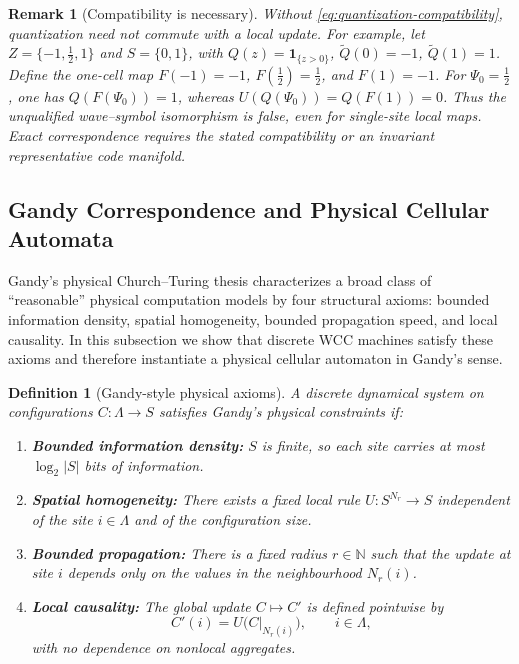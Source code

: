 \documentclass[12pt]{article}
\newtheorem{definition}[theorem]{Definition}
\newtheorem{remark}[theorem]{Remark}
\begin{document}
\begin{remark}[Compatibility is necessary]
\label{rem:wave-symbol-obstruction}
Without \eqref{eq:quantization-compatibility}, quantization need not
commute with a local update. For example, let
$Z=\{-1,\tfrac12,1\}$ and $S=\{0,1\}$, with
$Q(z)=\mathbf{1}_{\{z>0\}}$, $\widetilde Q(0)=-1$,
$\widetilde Q(1)=1$. Define the one-cell map
$F(-1)=-1$, $F(\tfrac12)=\tfrac12$, and $F(1)=-1$.
For $\Psi_0=\tfrac12$, one has $Q(F(\Psi_0))=1$,
whereas $U(Q(\Psi_0))=Q(F(1))=0$.
Thus the unqualified wave--symbol isomorphism is false, even for
single-site local maps. Exact correspondence requires the stated
compatibility or an invariant representative code manifold.
\end{remark}


\subsection{Gandy Correspondence and Physical Cellular Automata}
\label{subsec:gandy-correspondence}

Gandy's physical Church--Turing thesis characterizes a broad class of
``reasonable'' physical computation models by four structural axioms:
bounded information density, spatial homogeneity, bounded propagation
speed, and local causality. In this subsection we show that discrete WCC
machines satisfy these axioms and therefore instantiate a physical cellular
automaton in Gandy's sense.

\begin{definition}[Gandy-style physical axioms]
A discrete dynamical system on configurations $C : \Lambda \to S$ satisfies
Gandy's physical constraints if:
\begin{enumerate}
  \item \textbf{Bounded information density:} $S$ is finite, so each site
    carries at most $\log_2 |S|$ bits of information.
  \item \textbf{Spatial homogeneity:} There exists a fixed local rule
    $U : S^{N_r} \to S$ independent of the site $i \in \Lambda$ and of
    the configuration size.
  \item \textbf{Bounded propagation:} There is a fixed radius $r \in \mathbb{N}$
    such that the update at site $i$ depends only on the values in the
    neighbourhood $N_r(i)$.
  \item \textbf{Local causality:} The global update $C \mapsto C'$ is defined
    pointwise by
    \[
    C'(i) = U\big(C|_{N_r(i)}\big),
    \qquad i \in \Lambda,
    \]
    with no dependence on nonlocal aggregates.
\end{enumerate}
\end{definition}
\end{document}
